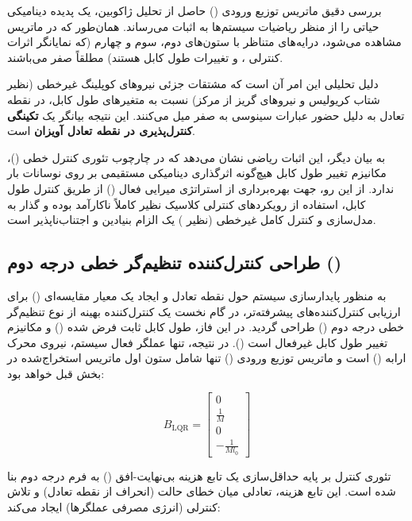 بررسی دقیق ماتریس توزیع ورودی () حاصل از تحلیل ژاکوبین، یک پدیده دینامیکی حیاتی را از منظر ریاضیات سیستم‌ها به اثبات می‌رساند. همان‌طور که در ماتریس  مشاهده می‌شود، درایه‌های متناظر با ستون‌های دوم، سوم و چهارم (که نمایانگر اثرات کنترلی ،  و تغییرات طول کابل هستند) مطلقاً صفر می‌باشند.

دلیل تحلیلی این امر آن است که مشتقات جزئی نیروهای کوپلینگ غیرخطی (نظیر شتاب کریولیس و نیروهای گریز از مرکز) نسبت به متغیرهای طول کابل، در نقطه تعادل  به دلیل حضور عبارات سینوسی به صفر میل می‌کنند. این نتیجه بیانگر یک \textbf{تکینگی کنترل‌پذیری در نقطه تعادل آویزان} است.

به بیان دیگر، این اثبات ریاضی نشان می‌دهد که در چارچوب تئوری کنترل خطی ()، مکانیزم تغییر طول کابل هیچ‌گونه اثرگذاری دینامیکی مستقیمی بر روی نوسانات بار ندارد. از این رو، جهت بهره‌برداری از استراتژی میرایی فعال () از طریق کنترل طول کابل، استفاده از رویکردهای کنترلی کلاسیک نظیر  کاملاً ناکارآمد بوده و گذار به مدل‌سازی و کنترل کامل غیرخطی (نظیر ) یک الزام بنیادین و اجتناب‌ناپذیر است.

\subsection{طراحی کنترل‌کننده تنظیم‌گر خطی درجه دوم ()}

به منظور پایدارسازی سیستم حول نقطه تعادل و ایجاد یک معیار مقایسه‌ای () برای ارزیابی کنترل‌کننده‌های پیشرفته‌تر، در گام نخست یک کنترل‌کننده بهینه از نوع تنظیم‌گر خطی درجه دوم () طراحی گردید. در این فاز، طول کابل ثابت فرض شده () و مکانیزم تغییر طول کابل غیرفعال است (). در نتیجه، تنها عملگر فعال سیستم، نیروی محرک ارابه () است و ماتریس توزیع ورودی () تنها شامل ستون اول ماتریس  استخراج‌شده در بخش قبل خواهد بود:

\begin{equation}
    \renewcommand{\arraystretch}{1.8}
    B_{\mathrm{LQR}} = \begin{bmatrix} 0 \\ \frac{1}{M} \\ 0 \\ -\frac{1}{M l_0} \end{bmatrix}
\end{equation}

تئوری کنترل  بر پایه حداقل‌سازی یک تابع هزینه بی‌نهایت-افق () به فرم درجه دوم بنا شده است. این تابع هزینه، تعادلی میان خطای حالت (انحراف از نقطه تعادل) و تلاش کنترلی (انرژی مصرفی عملگرها) ایجاد می‌کند:

